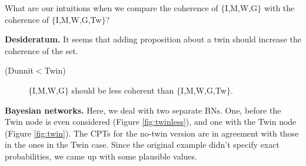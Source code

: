 \documentclass[
  10pt,
]{scrartcl}
\newcommand{\s}[1]{\textsf{#1}}
\begin{document}
\noindent What are our intuitions when we compare the coherence of \(\{\)\s{I,M,W,G}\(\}\) with the coherence of \(\{\)\s{I,M,W,G,Tw}\(\}\)?

\noindent \textbf{Desideratum.} It seems that adding proposition about a twin should increase the coherence of the set.

\vspace{2mm}\begin{description}
    \item[(Dunnit$<$Twin)] $\{$\s{I,M,W,G}$\}$ should be less coherent than $\{$\s{I,M,W,G,Tw}$\}$. 
\end{description}\vspace{2mm}

\textbf{Bayesian networks.} Here, we deal with two separate BNs. One, before the \textsf{Twin} node is even considered (Figure \ref{fig:twinless}), and one with the \textsf{Twin} node (Figure \ref{fig:twin}). The CPTs for the no-twin version are in agreement with those in the ones in the Twin case. Since the original example didn't specify exact probabilities, we came up with some plausible values.
\end{document}
